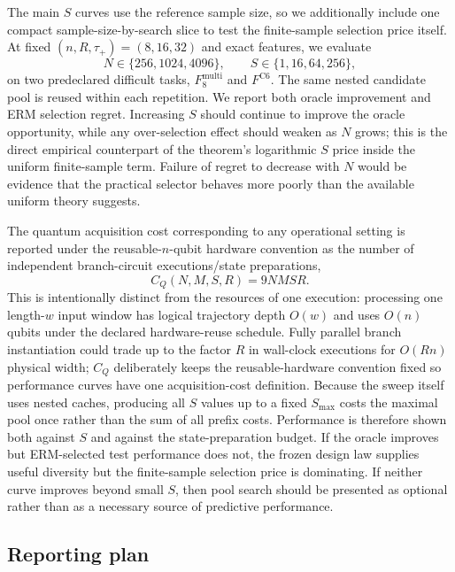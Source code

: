The main $S$ curves use the reference sample size, so we additionally include
one compact sample-size-by-search slice to test the finite-sample selection
price itself.  At fixed $(n,R,\tau_+)=(8,16,32)$ and exact features, we evaluate
\begin{equation}
    N\in\{256,1024,4096\},
    \qquad
    S\in\{1,16,64,256\},
    \label{eq:N-S-selection-grid}
\end{equation}
on two predeclared difficult tasks,
$F^{\mathrm{multi}}_{8}$ and $F^{\mathrm{C6}}$.  The same nested candidate pool
is reused within each repetition.  We report both oracle improvement and ERM
selection regret.  Increasing $S$ should continue to improve the oracle
opportunity, while any over-selection effect should weaken as $N$ grows; this
is the direct empirical counterpart of the theorem's logarithmic $S$ price
inside the uniform finite-sample term.  Failure of regret to decrease with $N$
would be evidence that the practical selector behaves more poorly than the
available uniform theory suggests.

The quantum acquisition cost corresponding to any operational setting is
reported under the reusable-$n$-qubit hardware convention as the number of
independent branch-circuit executions/state preparations,
\begin{equation}
    C_Q(N,M,S,R)=9NMSR.
    \label{eq:empirical-quantum-cost}
\end{equation}
This is intentionally distinct from the resources of one execution: processing
one length-$w$ input window has logical trajectory depth $O(w)$ and uses
$O(n)$ qubits under the declared hardware-reuse schedule.  Fully parallel
branch instantiation could trade up to the factor $R$ in wall-clock executions
for $O(Rn)$ physical width; $C_Q$ deliberately keeps the reusable-hardware
convention fixed so performance curves have one acquisition-cost definition.
Because the sweep itself uses nested caches, producing all $S$ values up to a
fixed $S_{\max}$ costs the maximal pool once rather than the sum of all prefix
costs.  Performance is therefore shown both against $S$ and against the
state-preparation budget.  If the oracle improves but ERM-selected test performance does not, the frozen
design law supplies useful diversity but the finite-sample selection price is
dominating.  If
neither curve improves beyond small $S$, then pool search should be presented
as optional rather than as a necessary source of predictive performance.

\subsection{Reporting plan}
\label{sec:empirical-reporting}

